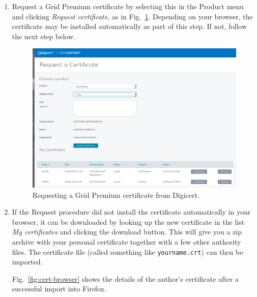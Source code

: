 \documentclass[a4paper]{article}
\begin{document}
\begin{enumerate}
\item Request a Grid Premium certificate by selecting this in the
  Product menu and clicking \emph{Request certificate}, as in
  Fig.~\ref{fig:digicert}.  Depending on your browser, the certificate
  may be installed automatically as part of this step. If not, follow
  the next step below.

  \begin{figure}[htb]
    \centering
    \includegraphics[width=1.0\linewidth]{digicert-request}
    \caption{Requesting a Grid Premium certificate from Digicert.}
    \label{fig:digicert}
  \end{figure}

\item If the Request procedure did not install the certificate
  automatically in your browser, it can be downloaded by looking up
  the new certificate in the list \emph{My certificates} and clicking
  the download button. This will give you a zip archive with your
  personal certificate together with a few other authority files. The
  certificate file (called something like \texttt{yourname.crt}) can
  then be imported.

  Fig.~\ref{fig:cert-browser} shows the details of the author's
  certificate after a successful import into Firefox.


\end{enumerate}
\end{document}
